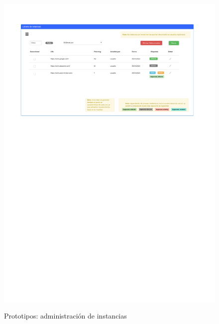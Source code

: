 \begin{figure}[h]
	\caption{Prototipos: administración de instancias}
	\centering
	\includegraphics[width=\textwidth]{../img/anexos/mockups/9-mockups-instances}
	\label{mock:instance-admin}
\end{figure}

